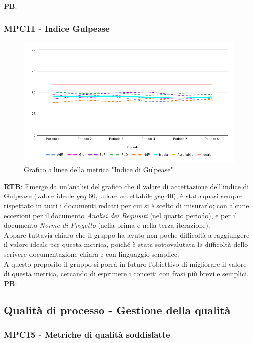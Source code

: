 \documentclass[10pt]{article}
\begin{document}
\begin{justify}
\noindent
\textbf{PB}:


\subsubsection{MPC11 - Indice Gulpease}%

\begin{figure}[H]
  \centering
  \includegraphics[width=0.9\linewidth]{gulpease.png}
  \caption{Grafico a linee della metrica "Indice di Gulpease"}
  \label{fig:gulpease_chart}
\end{figure}

\textbf{RTB}: Emerge da un'analisi del grafico che il valore di accettazione dell'indice di Gulpease (valore ideale $geq$ 60; valore accettabile $geq$ 40), è stato quasi sempre rispettato in tutti i documenti
redatti per cui si è scelto di misurarlo; con alcune eccezioni per il documento \textit{Analisi dei Requisiti} (nel quarto periodo), e per il documento \textit{Norme di Progetto} (nella prima e nella terza iterazione).\\
Appare tuttavia chiaro che il gruppo ha avuto non poche difficoltà a raggiungere il valore ideale per questa metrica, poiché è stata sottovalutata la difficoltà dello 
scrivere documentazione chiara e con linguaggio semplice.\\
A questo proposito il gruppo si porrà in futuro l'obiettivo di migliorare il valore di questa metrica, cercando di esprimere i concetti con frasi più brevi e semplici.\\

\noindent
\textbf{PB}:


\subsection{Qualità di processo - Gestione della qualità}
\subsubsection{MPC15 - Metriche di qualità soddisfatte}%


\end{justify}
\end{document}
